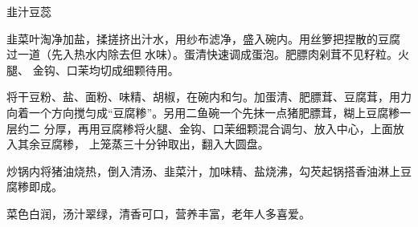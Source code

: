 \begin{recipe}{韭汁豆蕊}

\ingredients


\preparation

\step 韭菜叶淘净加盐，揉搓挤出汁水，用纱布滤净，盛入碗内。用丝箩把捏散的豆腐
过一道（先入热水内除去但𥑲水味）。蛋清快速调成蛋泡。肥膘肉剁茸不见籽粒。火腿、
金钩、口茉均切成细颗待用。

\step 将干豆粉、盐、面粉、味精、胡椒，在碗内和匀。加蛋清、肥膘茸、豆腐茸，用力
向着一个方向搅匀成“豆腐糁”。另用二鱼碗一个先抹一点猪肥膘茸，糊上豆腐糁一层约二
分厚，再用豆腐糁将火腿、金钩、口茉细颗混合调匀、放入中心，上面放入其余豆腐糁，
上笼蒸三十分钟取出，翻入大圆盘。

\step 炒锅内将猪油烧热，倒入清汤、韭菜汁，加味精、盐烧沸，勾芡起锅搭香油淋上豆
腐糁即成。

\features

菜色白润，汤汁翠绿，清香可口，营养丰富，老年人多喜爱。

\end{recipe}

